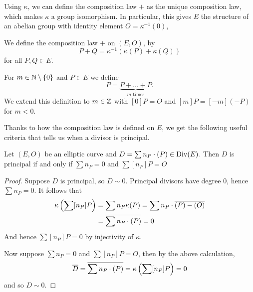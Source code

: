 
Using $\kappa$, we can define the composition law $+$ as the unique
composition law, which makes $\kappa$ a group isomorphism.
In particular, this gives $E$ the structure of an abelian group
with identity element $O = \kappa^{-1}(0)$,
\begin{definition}
	We define the composition law $+$ on $(E, O)$, by 
	\begin{equation*}
		P + Q = \kappa^{-1}(\kappa(P) + \kappa(Q))
	\end{equation*}
	for all $P, Q \in E$.
\end{definition}

\begin{notation}
	For $m \in \mathbb{N}\setminus\{0\}$ and $P \in E$ we define
	\begin{equation*}
		[m]P = \underbrace{P + \dots + P}_{m\textrm{ times}}.
	\end{equation*}
	We extend this definition to $m \in \mathbb{Z}$ with $[0]P = O$ and
	$[m]P = [-m](-P)$ for $m < 0$.
\end{notation}


Thanks to how the composition law is defined on $E$, we get the following useful
criteria that tells us when a divisor is principal.
\begin{proposition}
	\label{prop:div-principal}
	Let $(E, O)$ be an elliptic curve and $D = \sum n_P \cdot (P) \in \operatorname{Div}(E)$.
	Then $D$ is principal if and only if $\sum n_P = 0$ and $\sum [n_P]P = O$
\end{proposition}

\begin{proof}
	Suppose $D$ is principal, so $D\sim 0$. 
	Principal divisors have degree $0$,
	hence $\sum n_P = 0$. It follows that
	\begin{align*}
		\kappa\left(\sum [n_P]P\right) &= \sum n_P\kappa(P) = \sum n_P
		\cdot\overline{(P) - (O)}\\
		&= \overline{\sum n_P\cdot(P)} = 0
	\end{align*}
	And hence $\sum [n_P]P = 0$ by injectivity of $\kappa$.

	Now suppose $\sum n_P = 0$ and $\sum [n_P] P = O$,
	then by the above calculation,
	\begin{equation*}
		\overline{D} = \overline{\sum n_P\cdot(P)} = \kappa\left(\sum [n_P] P\right) = 0
	\end{equation*}
	and so $D \sim 0$.
\end{proof}

